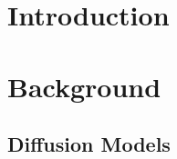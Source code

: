 \documentclass[ oneside,%
                    author={George Herbert},
                    degree={MSci},
                     title={Video Diffusion Models for Climate Simulations},
                  subtitle={}]{dissertation}
\begin{document}



%

\mainmatter


\chapter{Introduction}
\label{chap:introduction}

\chapter{Background}
\label{chap:background}

\section{Diffusion Models}
\label{sec:background_diffusion}
\end{document}
